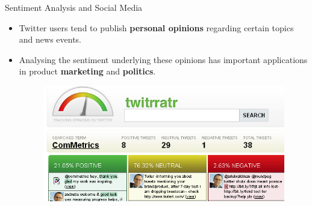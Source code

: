 \documentclass[handout]{beamer}
\begin{document}
\begin{frame}{Sentiment Analysis and Social Media}
\begin{scriptsize}
\begin{itemize}
 \item  Twitter users tend to publish \textbf{personal opinions} regarding certain topics and news events. 
 

 
 \item Analysing the sentiment underlying these opinions has important applications in product \textbf{marketing} and \textbf{politics}.
 
   \begin{figure}[h]
        	\includegraphics[scale = 0.4]{pics/tweetOpinions.png}
        \end{figure}
\end{itemize}
\end{scriptsize}

\end{frame}
\end{document}
